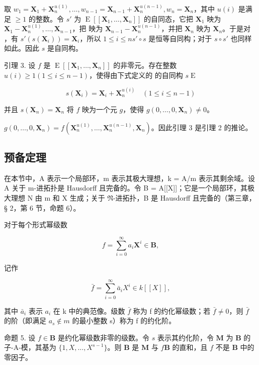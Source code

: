 取 \(w_1 = \mathbf{X}_1 + \mathbf{X}_n^{u(1)}, \ldots, w_{n-1} = \mathbf{X}_{n-1} + \mathbf{X}_n^{u(n-1)}, w_n = \mathbf{X}_n\)，其中 \(u(i)\) 是满足 \(\geqslant 1\) 的整数。令 \(s'\) 为 \(\operatorname{E}[[\mathbf{X}_1, \ldots, \mathbf{X}_n]]\) 的自同态，它把 \(\mathbf{X}_1\) 映为 \(\mathbf{X}_1 - \mathbf{X}_n^{u(1)}, \ldots, \mathbf{X}_{n-1}\)，把  映为 \(\mathbf{X}_{n-1} - \mathbf{X}_n^{u(n-1)}\)，并把 \(\mathbf{X}_n\) 映为 \(\mathbf{X}_n\)。于是对 ，有 \(s'(s(\mathbf{X}_i)) = \mathbf{X}_i\)，所以 \(1 \leqslant i \leqslant n\)\(s' \circ s\) 是恒等自同构；对于 \(s \circ s'\) 也同样如此。因此 \(s\) 是自同构。

引理 3. 设 \(f\) 是 \(\operatorname{E}[[\mathbf{X}_1, \ldots, \mathbf{X}_n]]\) 的非零元。存在整数 \(u(i) \geqslant 1 (1 \leqslant i \leqslant n - 1)\)，使得由下式定义的  的自同构 \(s\)\(\operatorname{E}\)

\[
s (\mathbf {X} _ {i}) = \mathbf {X} _ {i} + \mathbf {X} _ {n} ^ {u (i)} \quad (1 \leqslant i \leqslant n - 1)
\]

并且 \(s(\mathbf{X}_n) = \mathbf{X}_n\) 将 \(f\) 映为一个元 \(g\)，使得 \(g(0, \ldots, 0, \mathbf{X}_n) \neq 0\)。

\(g(0,\ldots,0,\mathbf{X}_n) = f(\mathbf{X}_n^{u(1)},\ldots ,\mathbf{X}_n^{u(n - 1)},\mathbf{X}_n)\)。因此引理 3 是引理 2 的推论。

\subsection{预备定理}

在本节中，A 表示一个局部环，m 表示其极大理想，k = A/m 表示其剩余域。设 A 关于 m-进拓扑是 Hausdorff 且完备的。令 B = A{[}{[}X{]}{]}；它是一个局部环，其极大理想 N 由 m 和 X 生成；关于 \(\mathfrak{N}\)-进拓扑，B 是 Hausdorff 且完备的（第三章，§ 2，第 6 节，命题 6）。

对于每个形式幂级数

\[
f = \sum_ {i = 0} ^ {\infty} a _ {i} \mathbf {X} ^ {i} \in \mathbf {B},
\]

记作

\[
\bar {f} = \sum_ {i = 0} ^ {\infty} \bar {a} _ {i} X ^ {i} \in k [ [ X ] ],
\]

其中 \(\bar{a}_{i}\) 表示 \(a_{i}\) 在 k 中的典范像。级数 \(\bar{f}\) 称为 f 的约化幂级数；若 \(\bar{f} \neq 0\)，则 \(\bar{f}\) 的阶（即满足 \(a_{s} \notin m\) 的最小整数 s）称为 f 的约化阶。

命题 5. 设 \(f \in \mathbf{B}\) 是约化幂级数非零的级数。令 \(s\) 表示其约化阶，令 \(\mathbf{M}\) 为 \(\mathbf{B}\) 的子-A-模，其基为 \(\{1, X, \ldots, X^{s-1}\}\)。则 \(\mathbf{B}\) 是 \(\mathbf{M}\) 与 \(f\mathbf{B}\) 的直和，且 \(f\) 不是 \(\mathbf{B}\) 中的零因子。

